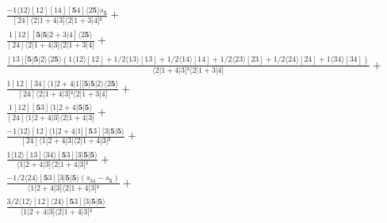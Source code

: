 \documentclass[varwidth, border=5pt]{standalone}
\begin{document}
\begin{my}
$\begin{gathered}
\scriptscriptstyle\frac{-1⟨12⟩[12][14][𝟓4]⟨2𝟓⟩s_{𝟓}}{[24]⟨2|1+4|3]⟨2|1+3|4]²} +\\
\scriptscriptstyle\frac{1[12][𝟓|𝟓|2+3|4]⟨2𝟓⟩}{[24]⟨2|1+4|3]⟨2|1+3|4]} +\\
\scriptscriptstyle\frac{[13][𝟓|𝟓|2⟩⟨2𝟓⟩(1⟨12⟩[12]+1/2⟨13⟩[13]+1/2⟨14⟩[14]+1/2⟨23⟩[23]+1/2⟨24⟩[24]+1⟨34⟩[34])}{⟨2|1+4|3]²⟨2|1+3|4]} +\\
\scriptscriptstyle\frac{1[12][34]⟨1|2+4|1][𝟓|𝟓|2⟩⟨2𝟓⟩}{[24]⟨2|1+4|3]²⟨2|1+3|4]} +\\
\scriptscriptstyle\frac{1[12][𝟓3]⟨1|2+4|𝟓|𝟓⟩}{[24]⟨1|2+4|3]⟨2|1+4|3]} +\\
\scriptscriptstyle\frac{-1⟨12⟩[12]⟨1|2+4|1][𝟓3][3|𝟓|𝟓⟩}{[24]⟨1|2+4|3]⟨2|1+4|3]²} +\\
\scriptscriptstyle\frac{1⟨12⟩[13]⟨34⟩[𝟓3][3|𝟓|𝟓⟩}{⟨1|2+4|3]⟨2|1+4|3]²} +\\
\scriptscriptstyle\frac{-1/2⟨24⟩[𝟓3][3|𝟓|𝟓⟩(s_{34}-s_{𝟓})}{⟨1|2+4|3]⟨2|1+4|3]²} +\\
\scriptscriptstyle\frac{3/2⟨12⟩[12]⟨24⟩[𝟓3][3|𝟓|𝟓⟩}{⟨1|2+4|3]⟨2|1+4|3]²} \phantom{+}
\end{gathered}$
\end{my}
\end{document}
